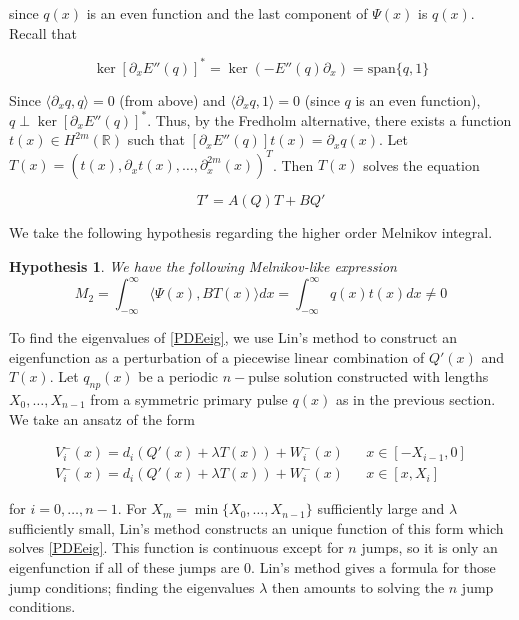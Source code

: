 \documentclass[12pt]{article}
\def\R{{\mathbb R}}
\newtheorem{hypothesis}{Hypothesis}
\begin{document}
since $q(x)$ is an even function and the last component of $\Psi(x)$ is $q(x)$. Recall that 

\[
\ker [\partial_x E''(q)]^* = \ker(-E''(q) \partial_x) = 
\text{span}\{ q, 1 \}
\]

Since $\langle \partial_x q, q \rangle = 0$ (from above) and $\langle \partial_x q, 1 \rangle = 0$ (since $q$ is an even function), $q \perp \ker [\partial_x E''(q)]^*$. Thus, by the Fredholm alternative, there exists a function $t(x) \in H^{2m}(\R)$ such that $[ \partial_x E''(q) ]t(x) = \partial_x q(x)$. Let $T(x) = (t(x), \partial_x t(x), \dots, \partial_x^{2m}(x))^T$. Then $T(x)$ solves the equation

\begin{equation}\label{eqforT}
T' = A(Q)T + B Q'
\end{equation}

We take the following hypothesis regarding the higher order Melnikov integral.

\begin{hypothesis}\label{Melnikov2hyp}
We have the following Melnikov-like expression
\begin{equation}\label{M2}
M_2 = \int_{-\infty}^\infty \langle \Psi(x), B T(x) \rangle dx =
\int_{-\infty}^\infty q(x) t(x) dx \neq 0
\end{equation}
\end{hypothesis}

To find the eigenvalues of \eqref{PDEeig}, we use Lin's method to construct an eigenfunction as a perturbation of a piecewise linear combination of $Q'(x)$ and $T(x)$. Let $q_{np}(x)$ be a periodic $n-$pulse solution constructed with lengths $X_0, \dots, X_{n-1}$ from a symmetric primary pulse $q(x)$ as in the previous section. We take an ansatz of the form 

\begin{align*}
V_i^-(x) = d_i (Q'(x) + \lambda T(x)) + W_i^-(x) && x \in [-X_{i-1}, 0] \\
V_i^-(x) = d_i (Q'(x) + \lambda T(x)) + W_i^-(x) && x \in [x, X_i]
\end{align*}

for $i = 0, \dots, n-1$. For $X_m = \min\{X_0, \dots, X_{n-1} \}$ sufficiently large and $\lambda$ sufficiently small, Lin's method constructs an unique function of this form which solves \eqref{PDEeig}. This function is continuous except for $n$ jumps, so it is only an eigenfunction if all of these jumps are 0. Lin's method gives a formula for those jump conditions; finding the eigenvalues $\lambda$ then amounts to solving the $n$ jump conditions.\\
\end{document}
